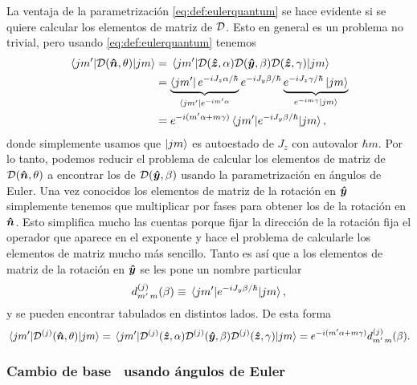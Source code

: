 \documentclass[10pt, a4paper]{article}
\numberwithin{equation}{subsection}
\begin{document}
La ventaja de la parametrización \eqref{eq:def:eulerquantum} se hace evidente
si se quiere calcular los elementos de matriz de $\RotationOp$. Esto en general
es un problema no trivial, pero usando \eqref{eq:def:eulerquantum} tenemos
\begin{align}
  \matrixel{jm'}{\RotationOp(\vers{n},\theta)}{jm} &=
  \matrixel{jm'}{\RotationOp(\vers{z},\alpha)
    \RotationOp(\vers{y},\beta)\RotationOp(\vers{z},\gamma)}{jm} \nonumber \\
  &= \underbrace{\bra{jm'}e^{-iJ_z\alpha/\hbar}}_{\bra{jm'}e^{-im'\alpha}}
  e^{-iJ_y\beta/\hbar}
  \underbrace{e^{-iJ_z\gamma/\hbar}\ket{jm}}_{e^{-im\gamma}\ket{jm}} \nonumber
  \\ &= e^{-i(m'\alpha + m\gamma)}\matrixel{jm'}{e^{-iJ_y\beta/\hbar}}{jm},
\end{align}
donde simplemente usamos que $\ket{jm}$ es autoestado de $J_z$ con autovalor
$\hbar m$. Por lo tanto, podemos reducir el problema de calcular los elementos
de matriz de $\RotationOp(\vers{n},\theta)$ a encontrar los de
$\RotationOp(\vers{y},\beta)$ usando la parametrización en ángulos de Euler.
Una vez conocidos los elementos de matriz de la rotación en $\vu*{y}$
simplemente tenemos que multiplicar por fases para obtener los de la rotación
en $\vu*{n}$. Esto simplifica mucho las cuentas porque fijar la dirección de
la rotación fija el operador que aparece en el exponente y hace el problema de
calcularle los elementos de matriz mucho más sencillo. Tanto es así que a los
elementos de matriz de la rotación en $\vu*{y}$ se les pone un nombre
particular
\begin{equation} \label{eq:def:matyrot}
  \RotationYMatrix^{(j)}_{m'\,m}(\beta) \defeq
    \matrixel{jm'}{e^{-iJ_y\beta/\hbar}}{jm},
\end{equation}
y se pueden encontrar tabulados en distintos lados. De esta forma
\begin{equation} \label{eq:def:matrotyz}
  \matrixel{jm'}{\RotationOp[j](\vers{n},\theta)}{jm} =
  \matrixel{jm'}{\RotationOp[j](\vers{z},\alpha)
    \RotationOp[j](\vers{y},\beta)\RotationOp[j](\vers{z},\gamma)}{jm}
  = e^{-i(m'\alpha + m\gamma)} \RotationYMatrix^{(j)}_{m'\,m}(\beta).
\end{equation}

\subsubsection{Cambio de base \spinhalf~usando ángulos de Euler}
\end{document}
